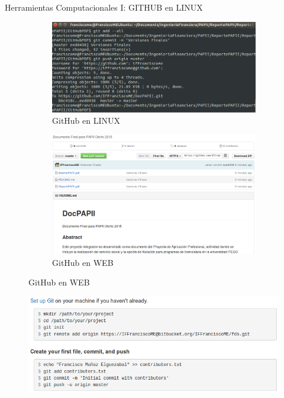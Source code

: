 \documentclass{bredelebeamer}
\begin{document}

\begin{frame}{Herramientas Computacionales I: GITHUB en LINUX}

\begin{figure}
\centering
\begin{subfigure}{.5\textwidth}
  \centering
  \includegraphics[width=1.1\linewidth]{images/GitHubLINUX.png}
  \caption{GitHub en LINUX}
\end{subfigure}%
\begin{subfigure}{.5\textwidth}
  \centering
  \includegraphics[width=.85\linewidth]{images/GitHubWEB.png}
  \caption{GitHub en WEB}
\end{subfigure}
\end{figure}

\begin{figure}[H]
\centering
\includegraphics[scale=.34]{images/SetupGit.png}
\end{figure}


\end{frame}
\end{document}
